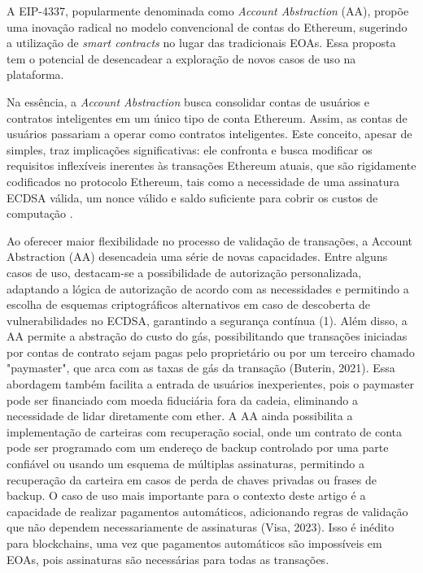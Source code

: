 \documentclass[12pt]{article}
\begin{document}
A EIP-4337, popularmente denominada como \textit{Account Abstraction} (AA), propõe uma inovação
radical no modelo convencional de contas do Ethereum, sugerindo a utilização de \textit{smart
  contracts} no lugar das tradicionais EOAs. Essa proposta tem o potencial de desencadear a
exploração de novos casos de uso na plataforma.

Na essência, a \textit{Account Abstraction} busca consolidar contas de usuários e contratos
inteligentes em um único tipo de conta Ethereum. Assim, as contas de usuários passariam a operar
como contratos inteligentes. Este conceito, apesar de simples, traz implicações significativas: ele
confronta e busca modificar os requisitos inflexíveis inerentes às transações Ethereum atuais, que
são rigidamente codificados no protocolo Ethereum, tais como a necessidade de uma assinatura ECDSA
válida, um nonce válido e saldo suficiente para cobrir os custos de computação \cite{Visa2023}.

Ao oferecer maior flexibilidade no processo de validação de transações, a Account Abstraction (AA)
desencadeia uma série de novas capacidades. Entre alguns casos de uso, destacam-se a possibilidade
de autorização personalizada, adaptando a lógica de autorização de acordo com as necessidades e
permitindo a escolha de esquemas criptográficos alternativos em caso de descoberta de
vulnerabilidades no ECDSA, garantindo a segurança contínua (1). Além disso, a AA permite a
abstração do custo do gás, possibilitando que transações iniciadas por contas de contrato sejam
pagas pelo proprietário ou por um terceiro chamado "paymaster", que arca com as taxas de gás da
transação (Buterin, 2021). Essa abordagem também facilita a entrada de usuários inexperientes, pois
o paymaster pode ser financiado com moeda fiduciária fora da cadeia, eliminando a necessidade de
lidar diretamente com ether. A AA ainda possibilita a implementação de carteiras com recuperação
social, onde um contrato de conta pode ser programado com um endereço de backup controlado por uma
parte confiável ou usando um esquema de múltiplas assinaturas, permitindo a recuperação da carteira
em casos de perda de chaves privadas ou frases de backup. O caso de uso mais importante para o
contexto deste artigo é a capacidade de realizar pagamentos automáticos, adicionando regras de
validação que não dependem necessariamente de assinaturas (Visa, 2023). Isso é inédito para
blockchains, uma vez que pagamentos automáticos são impossíveis em EOAs, pois assinaturas são
necessárias para todas as transações.
\end{document}
